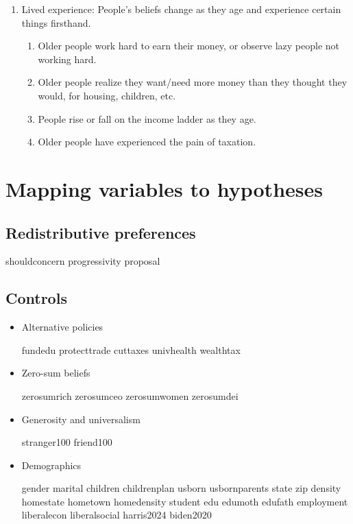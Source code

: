 \documentclass[12pt]{article}
\begin{document}
\begin{enumerate}
    Young people nowadays believe less in mobility, so they believe redistributing income will not distort incentives much.
    \item Lived experience: People's beliefs change as they age and experience certain things firsthand.
    \begin{enumerate}
        \item Older people work hard to earn their money, or observe lazy people not working hard.
        \item Older people realize they want/need more money than they thought they would, for housing, children, etc. 
        \item People rise or fall on the income ladder as they age.
        \item Older people have experienced the pain of taxation.
    \end{enumerate}
\end{enumerate}


\section*{Mapping variables to hypotheses}

\subsection*{Redistributive preferences}

shouldconcern progressivity proposal

\subsection*{Controls}

\begin{itemize}
    \item Alternative policies

    fundedu protecttrade cuttaxes univhealth wealthtax

    \item Zero-sum beliefs

    zerosumrich zerosumceo zerosumwomen zerosumdei

    \item Generosity and universalism

    stranger100 friend100

    \item Demographics

    gender marital children childrenplan usborn usbornparents state zip density homestate hometown homedensity student edu edumoth edufath employment liberalecon liberalsocial harris2024 biden2020 
    
\end{itemize}
\end{document}
